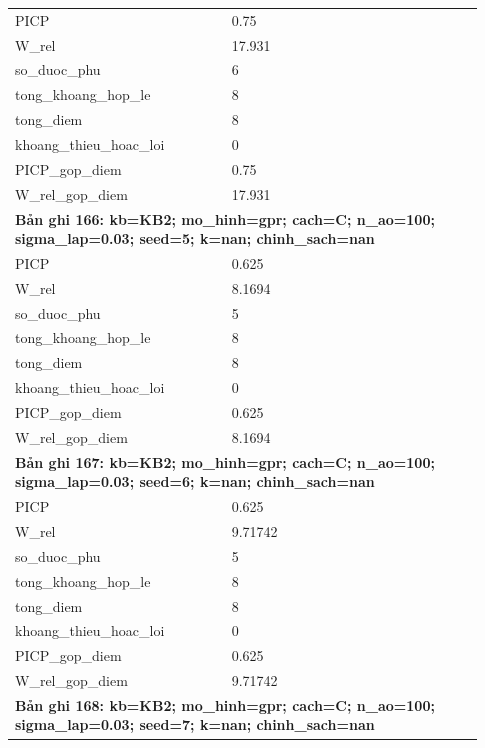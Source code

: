 \begin{longtable}{p{0.43\linewidth}p{0.50\linewidth}}
PICP & 0.75 \\
W\_\allowbreak rel & 17.931 \\
so\_\allowbreak duoc\_\allowbreak phu & 6 \\
tong\_\allowbreak khoang\_\allowbreak hop\_\allowbreak le & 8 \\
tong\_\allowbreak diem & 8 \\
khoang\_\allowbreak thieu\_\allowbreak hoac\_\allowbreak loi & 0 \\
PICP\_\allowbreak gop\_\allowbreak diem & 0.75 \\
W\_\allowbreak rel\_\allowbreak gop\_\allowbreak diem & 17.931 \\
\midrule
\multicolumn{2}{p{0.95\linewidth}}{\textbf{Bản ghi 166: kb=KB2; mo\_hinh=gpr; cach=C; n\_ao=100; sigma\_lap=0.03; seed=5; k=nan; chinh\_sach=nan}} \\
PICP & 0.625 \\
W\_\allowbreak rel & 8.1694 \\
so\_\allowbreak duoc\_\allowbreak phu & 5 \\
tong\_\allowbreak khoang\_\allowbreak hop\_\allowbreak le & 8 \\
tong\_\allowbreak diem & 8 \\
khoang\_\allowbreak thieu\_\allowbreak hoac\_\allowbreak loi & 0 \\
PICP\_\allowbreak gop\_\allowbreak diem & 0.625 \\
W\_\allowbreak rel\_\allowbreak gop\_\allowbreak diem & 8.1694 \\
\midrule
\multicolumn{2}{p{0.95\linewidth}}{\textbf{Bản ghi 167: kb=KB2; mo\_hinh=gpr; cach=C; n\_ao=100; sigma\_lap=0.03; seed=6; k=nan; chinh\_sach=nan}} \\
PICP & 0.625 \\
W\_\allowbreak rel & 9.71742 \\
so\_\allowbreak duoc\_\allowbreak phu & 5 \\
tong\_\allowbreak khoang\_\allowbreak hop\_\allowbreak le & 8 \\
tong\_\allowbreak diem & 8 \\
khoang\_\allowbreak thieu\_\allowbreak hoac\_\allowbreak loi & 0 \\
PICP\_\allowbreak gop\_\allowbreak diem & 0.625 \\
W\_\allowbreak rel\_\allowbreak gop\_\allowbreak diem & 9.71742 \\
\midrule
\multicolumn{2}{p{0.95\linewidth}}{\textbf{Bản ghi 168: kb=KB2; mo\_hinh=gpr; cach=C; n\_ao=100; sigma\_lap=0.03; seed=7; k=nan; chinh\_sach=nan}} \\

\end{longtable}
